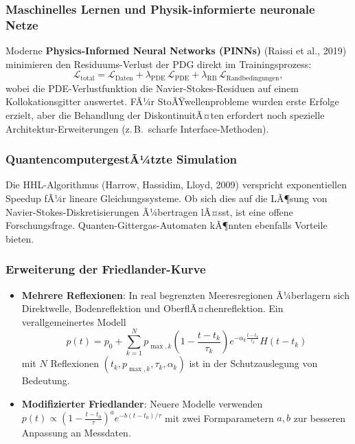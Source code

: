 ﻿\documentclass[12pt,a4paper]{article}
\theoremstyle{definition}
\theoremstyle{remark}
\begin{document}
\subsubsection{Maschinelles Lernen und Physik-informierte neuronale Netze}

Moderne \textbf{Physics-Informed Neural Networks (PINNs)} (Raissi et al., 2019) minimieren den Residuums-Verlust der PDG direkt im Trainingsprozess:
\begin{equation}
\mathcal{L}_{\text{total}} = \mathcal{L}_{\text{Daten}} + \lambda_{\text{PDE}}\,\mathcal{L}_{\text{PDE}} + \lambda_{\text{RB}}\,\mathcal{L}_{\text{Randbedingungen}},
\end{equation}
wobei die PDE-Verlustfunktion die Navier-Stokes-Residuen auf einem Kollokationsgitter auswertet. FÃ¼r StoÃŸwellenprobleme wurden erste Erfolge erzielt, aber die Behandlung der DiskontinuitÃ¤ten erfordert noch spezielle Architektur-Erweiterungen (z.\,B.\ scharfe Interface-Methoden).

\subsubsection{QuantencomputergestÃ¼tzte Simulation}

Die HHL-Algorithmus (Harrow, Hassidim, Lloyd, 2009) verspricht exponentiellen Speedup fÃ¼r lineare Gleichungssysteme. Ob sich dies auf die LÃ¶sung von Navier-Stokes-Diskreti\-sierungen Ã¼bertragen lÃ¤sst, ist eine offene Forschungsfrage. Quanten-Gittergas-Automaten kÃ¶nnten ebenfalls Vorteile bieten.

\subsubsection{Erweiterung der Friedlander-Kurve}

\begin{itemize}
\item \textbf{Mehrere Reflexionen}: In real begrenzten Meeresregionen Ã¼berlagern sich Direktwelle, Bodenreflektion und OberflÃ¤chenreflektion. Ein verallgemeinertes Modell
\begin{equation}
p(t) = p_0 + \sum_{k=1}^N p_{\max,k}\left(1 - \frac{t-t_k}{\tau_k}\right)e^{-\alpha_k\frac{t-t_k}{\tau_k}} H(t-t_k)
\end{equation}
mit $N$ Reflexionen $(t_k, p_{\max,k}, \tau_k, \alpha_k)$ ist in der Schutzauslegung von Bedeutung.
\item \textbf{Modifizierter Friedlander}: Neuere Modelle verwenden $p(t) \propto \left(1 - \frac{t-t_0}{\tau}\right)^a e^{-b(t-t_0)/\tau}$ mit zwei Formparametern $a, b$ zur besseren Anpassung an Messdaten.
\end{itemize}
\end{document}
